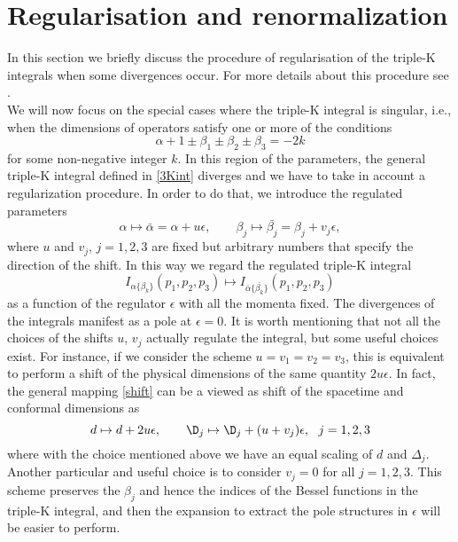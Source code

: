 \documentclass[a4paper,11pt,openright,twoside]{book}
\let\a=\alpha   \let\b=\beta   \let\g=\gamma   \let\d=\delta
\let\e=\epsilon \let\z=\zeta   \let\h=\eta     \let\q=\theta
\numberwithin{equation}{section}
\begin{document}
{{{%
\section{Regularisation and renormalization}\label{reg}
{ In this section we briefly discuss the procedure of regularisation of the triple-K integrals when some divergences occur. For more details about this procedure see \cite{Bzowski:2014qja,Bzowski:2015yxv, Bzowski:2017poo}.\\
	We will now focus on the special cases where the triple-K integral is singular, i.e., when the dimensions of operators satisfy one or more of the conditions
	\begin{equation}
		\a+1\pm\b_1\pm\b_2\pm\b_3=-2k\label{cond}
	\end{equation}
	for some non-negative integer $k$. In this region of the parameters, the general triple-K integral defined in \eqref{3Kint} diverges and we have to take in account a regularization procedure. In order to do that, we introduce the regulated parameters}
\begin{equation}
	\a\mapsto\bar{\a}=\a+u\e,\qquad \b_j\mapsto\bar{\b_j}=\b_j+v_j\e,\label{shift}
\end{equation}
where $u$ and $v_j$, $j=1,2,3$ are fixed but arbitrary numbers that specify the direction of the shift. In this way we regard the regulated triple-K integral 
\begin{equation}
	I_{\a\{\b_k\}}(p_1,p_2,p_3)\mapsto I_{\bar{\a}\{\bar{\b_k}\}}(p_1,p_2,p_3)
\end{equation}
as a function of the regulator $\e$ with all the momenta fixed. The divergences of the integrals manifest as a pole at $\e=0$. { It is worth mentioning that not all the choices of the shifts $u$, $v_j$ actually regulate the integral, but some useful choices exist. For instance, if we consider the scheme $u=v_1=v_2=v_3$, this is equivalent to perform a shift of the physical dimensions of the same quantity $2u\e$. In fact, the general mapping \eqref{shift} can be a viewed as shift of the spacetime and conformal dimensions as
	\begin{equation}
		d\mapsto d+2u\e,\qquad \D_j\mapsto\D_j+(u+v_j)\e,\ \ j=1,2,3
	\end{equation}
	where with the choice mentioned above we have an equal scaling of $d$ and $\Delta_j$. Another particular and useful choice is to consider $v_j=0$ for all $j=1,2,3$. This scheme preserves the $\b_j$ and hence the indices of the Bessel functions in the triple-K integral, and then the expansion to extract the pole structures in $\e$ will be easier to perform.\\ 
}}}}
\end{document}
